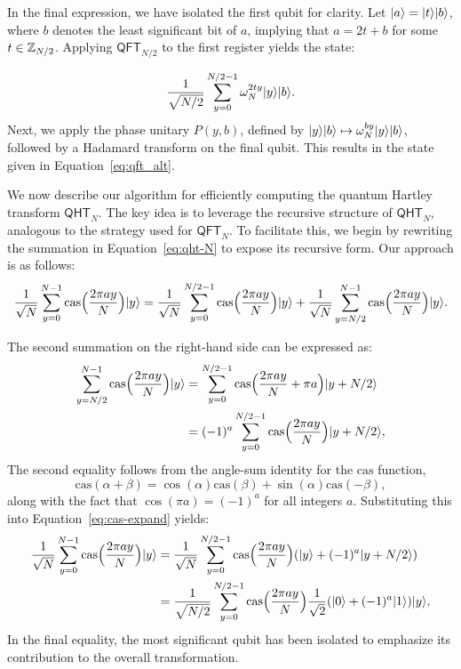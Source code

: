 \documentclass[11pt]{article}
\theoremstyle{definition}
\newcommand{\cas}{\mathrm{cas}}
\newcommand{\qht}{\mathsf{QHT}}
\newcommand{\qft}{\mathsf{QFT}}
\begin{document}
In the final expression, we have isolated the first qubit for clarity. Let \( \lvert a\rangle = \lvert t\rangle\lvert b\rangle \), where \( b \) denotes the least significant bit of \( a \), implying that \( a = 2t + b \) for some \( t \in \mathbb{Z}_{N / 2} \). Applying \( \qft_{N / 2} \) to the first register yields the state:

\[ \frac{1}{\sqrt{N / 2}} \sum_{y = 0}^{N / 2 - 1} \omega_N^{2ty} \lvert y\rangle \lvert b\rangle. \]
Next, we apply the phase unitary \( P(y, b) \), defined by \( \lvert y\rangle \lvert b\rangle \mapsto \omega_N^{by} \lvert y\rangle \lvert b\rangle \), followed by a Hadamard transform on the final qubit. This results in the state given in Equation~\eqref{eq:qft_alt}.


We now describe our algorithm for efficiently computing the quantum Hartley transform \( \qht_N \). The key idea is to leverage the recursive structure of \( \qht_N \), analogous to the strategy used for \( \qft_N \). To facilitate this, we begin by rewriting the summation in Equation~\eqref{eq:qht-N} to expose its recursive form. Our approach is as follows:
\begin{equation}
    \label{eq:cas-expand}
	\frac{1}{\sqrt{N}} \sum_{y = 0}^{N - 1} \cas\Big( \frac{2\pi a y}{N} \Big) \ket{y}
    = \frac{1}{\sqrt{N}} \sum_{y = 0}^{N / 2 - 1} \cas\Big( \frac{2\pi a y}{N} \Big) \ket{y} + \frac{1}{\sqrt{N}} \sum_{y = N / 2}^{N - 1} \cas\Big( \frac{2\pi a y}{N} \Big) \ket{y}.
\end{equation}



The second summation on the right-hand side can be expressed as:
\begin{align*}
	\sum_{y = N / 2}^{N - 1} \cas\Big( \frac{2\pi a y}{N} \Big) \ket{y}
    & = \sum_{y = 0}^{N / 2 - 1} \cas\Big( \frac{2\pi a y}{N} + \pi a \Big) \ket{y + N/2} \\
    & = (-1)^a \sum_{y = 0}^{N / 2 - 1} \cas\Big( \frac{2\pi a y}{N} \Big) \ket{y + N/2},
\end{align*}
The second equality follows from the angle-sum identity for the \( \cas \) function,
\[
\cas(\alpha + \beta) = \cos(\alpha)\cas(\beta) + \sin(\alpha)\cas(-\beta),
\]
along with the fact that \( \cos(\pi a) = (-1)^a \) for all integers \( a \). Substituting this into Equation~\eqref{eq:cas-expand} yields:
\begin{align}
	\frac{1}{\sqrt{N}} \sum_{y = 0}^{N - 1} \cas\Big( \frac{2\pi a y}{N} \Big) \ket{y}
    & = \frac{1}{\sqrt{N}} \sum_{y = 0}^{N / 2 - 1} \cas\Big( \frac{2\pi a y}{N} \Big) (\ket{y} + (-1)^a \ket{y + N/2}) \nonumber \\
    & = \frac{1}{\sqrt{N / 2}} \sum_{y = 0}^{N / 2 - 1} \cas\Big( \frac{2\pi a y}{N} \Big) \frac{1}{\sqrt{2}} (\ket{0} + (-1)^a \ket{1}) \ket{y}, \label{eq:qht-alt} 
\end{align}
In the final equality, the most significant qubit has been isolated to emphasize its contribution to the overall transformation.
\end{document}
